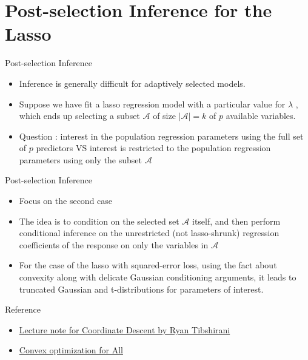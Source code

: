 \documentclass[11pt]{beamer}
\newcommand{\A}{\mathcal{A}}
\begin{document}
\section{Post-selection Inference for the Lasso}
\begin{frame}{Post-selection Inference}
    \begin{itemize}
        \item Inference is generally difficult for adaptively selected models.
        \item Suppose we have fit a lasso regression model with a particular value for $\lambda$ , which ends up selecting a subset $\A$ of size $|\A|=k$ of $p$ available variables. 
        \item Question : interest in the population regression parameters using the full set of $p$ predictors VS interest is restricted to the population regression parameters using only the subset $\A$
    \end{itemize}
\end{frame}

\begin{frame}{Post-selection Inference}
    \begin{itemize}
        \item Focus on the second case
        \item The idea is to condition on the selected set $\A$ itself, and then perform conditional inference on the unrestricted (not lasso-shrunk) regression coefficients of the response on only the variables in $\A$
        \item For the case of the lasso with squared-error loss, using the fact about convexity along with delicate Gaussian conditioning arguments, it leads to truncated Gaussian and t-distributions for parameters of interest.
    \end{itemize}
\end{frame}

\begin{frame}{Reference}
    \nocite{efron_hastie_2016}
    
    \begin{itemize}
        \item \href{http://www.stat.cmu.edu/~ryantibs/convexopt/lectures/coord-desc.pdf}{Lecture note for Coordinate Descent by Ryan Tibshirani}
        \item \href{https://wikidocs.net/23714}{Convex optimization for All}
    \end{itemize}
\end{frame}
\end{document}
